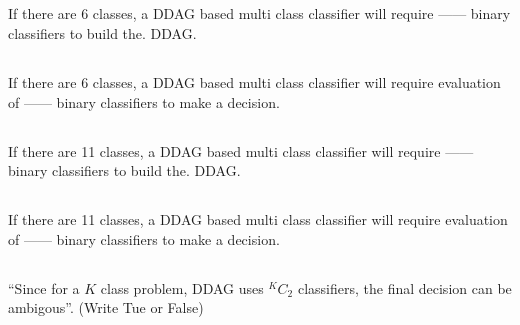 \begin{frame}
\section{}
If there are 6 classes, a DDAG based multi class classifier will require ------ binary classifiers to build the. DDAG.

\end{frame}

\begin{frame}
\section{}
If there are 6 classes, a DDAG based multi class classifier will require evaluation of ------ binary classifiers to make a decision.


\end{frame}

\begin{frame}
\section{}
If there are 11 classes, a DDAG based multi class classifier will require ------ binary classifiers to build the. DDAG.


\end{frame}

\begin{frame}
\section{}
If there are 11 classes, a DDAG based multi class classifier will require evaluation of ------ binary classifiers to make a decision.

\end{frame}

\begin{frame}
\section{}
``Since for a $K$ class problem, DDAG uses $^KC_2$ classifiers, the final decision can be ambigous''. (Write Tue or False)

\end{frame}
